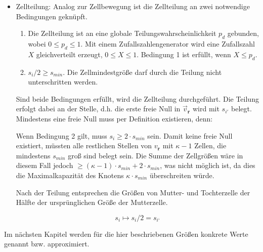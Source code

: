 \documentclass[11pt,a4paper,pointlessnumbers]{scrreprt}  %
\begin{document}
\begin{itemize}
	\item Zellteilung: Analog zur Zellbewegung ist die Zellteilung an zwei notwendige Bedingungen geknüpft.
	
	\begin{enumerate}
		\item Die Zellteilung ist an eine globale Teilungswahrscheinlichkeit $p_{d}$ gebunden, wobei $0 \leq p_{d} \leq 1$. Mit einem Zufallszahlengenerator wird eine Zufallszahl $X$ gleichverteilt erzeugt, $0 \leq X \leq 1$. Bedingung 1 ist erfüllt, wenn $X \leq p_{d}$.
		
		\item $s_{i}/2 \geq s_{min}$. Die Zellmindestgröße darf durch die Teilung nicht unterschritten werden. 
	\end{enumerate}

	Sind beide Bedingungen erfüllt, wird die Zellteilung durchgeführt. Die Teilung erfolgt dabei an der Stelle, d.h. die erste freie Null in $\vec{v}_{\boldsymbol{r}}$ wird mit $s_{i'}$ belegt. Mindestens eine freie Null muss per Definition existieren, denn:\par 
	Wenn Bedingung 2 gilt, muss $s_{i} \geq 2 \cdot s_{min}$ sein. Damit keine freie Null existiert, müssten alle restlichen Stellen von $v_{\boldsymbol{r}}$ mit $\kappa - 1$ Zellen, die mindestens $s_{min}$ groß sind belegt sein. Die Summe der Zellgrößen wäre in diesem Fall jedoch $\geq (\kappa-1) \cdot s_{min} + 2 \cdot s_{min}$, was nicht möglich ist, da dies die Maximalkapazität des Knotens $\kappa \cdot s_{min}$ überschreiten würde.
	
	
	Nach der Teilung entsprechen die Größen von Mutter- und Tochterzelle der Hälfte der ursprünglichen Größe der Mutterzelle.
	
	\[
	s_{i} \mapsto s_{i}/2 = s_{i‘}
	\]
	
\end{itemize}

Im nächsten Kapitel werden für die hier beschriebenen Größen konkrete Werte genannt bzw. approximiert.
\end{document}
